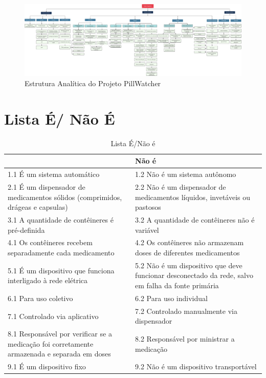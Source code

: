 \begin{apendicesenv}
\begin{figure}[H]
    \centering
    \includegraphics[scale=0.31, angle=90]{figuras/EAP.pdf}
    \caption{Estrutura Analítica do Projeto PillWatcher}
    \label{fig:EAP}
\end{figure}


%

\chapter{Lista É/ Não É}
\label{Lista_app}

\begin{table}[H]
    \centering
    \caption{Lista É/Não é}
    \label{tab:lista_e_n_e}
    \begin{tabularx}{\textwidth}{|X|X|}
        \hline
        \rowcolor[HTML]{A8DADC}
        \multicolumn{1}{|X}{\textbf{É}} & \multicolumn{1}{|X|}{\textbf{Não é}} \\ 
        \hline
        1.1 É um sistema automático & 1.2 Não é um sistema autônomo \\ 
        \hline
        2.1 É um dispensador de medicamentos sólidos (comprimidos, drágeas e capsulas) & 2.2 Não é um dispensador de medicamentos líquidos, invetáveis ou pastosos \\ 
        \hline
        3.1 A quantidade de contêineres é pré-definida & 3.2 A quantidade de contêineres não é variável\\ 
        \hline
        4.1 Os contêineres recebem separadamente cada medicamento & 4.2 Os contêineres não armazenam doses de diferentes medicamentos \\
        \hline
        5.1 É um dispositivo que funciona interligado à rede elétrica & 5.2 Não é um dispositivo que deve funcionar desconectado da rede, salvo em falha da fonte primária \\ 
        \hline
        6.1 Para uso coletivo & 6.2 Para uso individual\\ 
        \hline
        7.1 Controlado via aplicativo & 7.2 Controlado manualmente via dispensador\\ 
        \hline
        8.1 Responsável por verificar se a medicação foi corretamente armazenada e separada em doses & 8.2 Responsável por ministrar a medicação\\ 
        \hline
        9.1 É um dispositivo fixo & 9.2 Não é um dispositivo transportável \\ 
        \hline
    \end{tabularx}
\end{table}


\end{apendicesenv}
